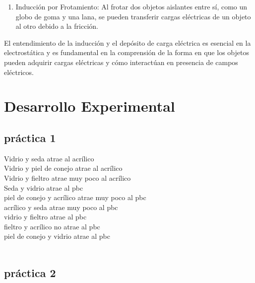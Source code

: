 \documentclass{article}
\begin{document}
\begin{multicols}{2}
\begin{enumerate}
\item Inducción por Frotamiento: Al frotar dos objetos aislantes entre sí, como un globo de goma y una lana, se pueden transferir cargas eléctricas de un objeto al otro debido a la fricción.

\end{enumerate}

El entendimiento de la inducción y el depósito de carga eléctrica es esencial
en la electrostática y es fundamental en la comprensión de la forma en que los
objetos pueden adquirir cargas eléctricas y cómo interactúan en presencia de campos eléctricos.

\section{Desarrollo Experimental}\label{Desarrollo experimental}				%
\subsection{práctica 1}\label{p1}

	Vidrio y seda atrae al acrílico\\ 
	Vidrio y piel de conejo atrae al acrílico\\ 
	Vidrio y fieltro atrae muy poco al acrílico\\ 

	Seda y vidrio atrae al pbc\\
	piel de conejo y acrílico atrae muy poco al pbc\\
	acrílico y seda atrae muy poco al pbc\\
	vidrio y fieltro atrae al pbc\\
	fieltro y acrílico no atrae al pbc\\
	piel de conejo y vidrio atrae al pbc\\ \\
\subsection{práctica 2}\label{p2}


\end{multicols}
\end{document}

